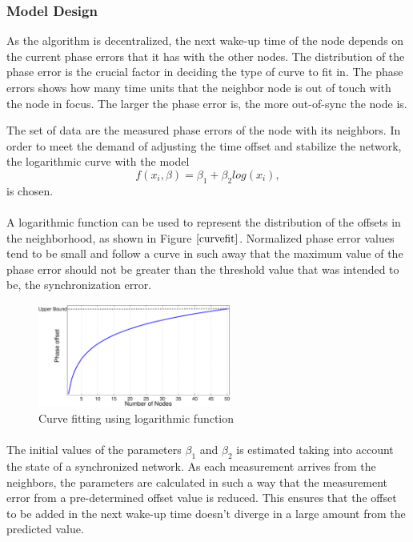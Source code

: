 \documentclass[a4paper,10pt]{report}
\begin{document}
\subsubsection{Model Design}
As the algorithm is decentralized, the next wake-up time of the node depends on the current phase errors that it has with the other nodes. The distribution of the phase error is the crucial factor in deciding the type of curve to fit in. The phase errors shows how many time units that the neighbor node is out of touch with the node in focus. The larger the phase error is, the more out-of-sync the node is.\par
The set of data are the measured phase errors of the node with its neighbors.  In order to meet the demand of adjusting the time offset and stabilize the network, the logarithmic curve with the model
\begin{equation}
 f(x_i,\beta)= \beta _1 + \beta_2log(x_i),
\end{equation}
is chosen. \paragraph*{}
A logarithmic function can be used to represent the distribution of the offsets in the neighborhood, as shown in Figure $\ref{curvefit}$.
Normalized phase error values tend to be small and follow a curve in such away that the maximum value of the phase error should not be greater than the threshold value that was intended to be, the synchronization error.
\begin{figure}
\centering
\includegraphics[width=2.5in]{curvefit}
\caption{Curve fitting using logarithmic function} \label{curvefit}
\end{figure}
\paragraph*{}
The initial values of the parameters $\beta_1$ and $\beta_2$ is estimated taking into account the state of a synchronized network. As each measurement arrives from the neighbors, the parameters are calculated in such a way that the measurement error from a pre-determined offset value is reduced. This ensures that the offset to be added in the next wake-up time doesn't diverge in a large amount from the predicted value.
\end{document}

